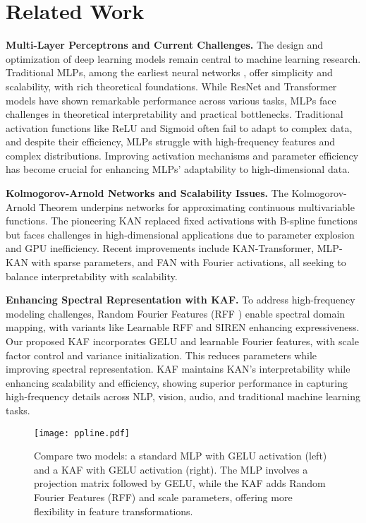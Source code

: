 \section{Related Work}
\textbf{Multi-Layer Perceptrons and Current Challenges.} The design and optimization of deep learning \cite{deit}models remain central to machine learning research. Traditional MLPs\cite{MLP}, among the earliest neural networks \cite{sjwl02}, offer simplicity and scalability, with rich theoretical foundations. While ResNet \cite{resnet18} and Transformer \cite{transform} models have shown remarkable performance across various tasks, MLPs face challenges in theoretical interpretability and practical bottlenecks. Traditional activation functions like ReLU \cite{ReLU1,ReLU2} and Sigmoid \cite{Sigmoidjihuo} often fail to adapt to complex data, and despite their efficiency, MLPs struggle with high-frequency features and complex distributions. Improving activation mechanisms and parameter efficiency has become crucial for enhancing MLPs' adaptability to high-dimensional data.

\textbf{Kolmogorov-Arnold Networks and Scalability Issues.} The Kolmogorov-Arnold \cite{2019duichengkanl} Theorem underpins networks for approximating continuous multivariable functions. The pioneering KAN replaced fixed activations with B-spline \cite{B-spline} functions but faces challenges in high-dimensional applications due to parameter explosion and GPU inefficiency. Recent improvements include KAN-Transformer, MLP-KAN with sparse parameters, and FAN\cite{FAN} with Fourier activations, all seeking to balance interpretability with scalability.

\textbf{Enhancing Spectral Representation with KAF.} To address high-frequency modeling challenges, Random Fourier Features (RFF \cite{suijifuly,suijifulye2}) enable spectral domain mapping, with variants like Learnable RFF and SIREN enhancing expressiveness. Our proposed KAF incorporates GELU and learnable Fourier features, with scale factor control and variance initialization. This reduces parameters while improving spectral representation. KAF maintains KAN's interpretability while enhancing scalability and efficiency, showing superior performance in capturing high-frequency\cite{SIRENgaoping} details across NLP, vision, audio, and traditional machine learning tasks.
\begin{figure*}[t]  %
    \centering
    \texttt{[image: ppline.pdf]}  %
    \vspace{-20pt}
    \caption{Compare two models: a standard MLP with GELU activation (left) and a KAF with GELU activation (right). The MLP involves a projection matrix followed by GELU, while the KAF adds Random Fourier Features (RFF) and scale parameters, offering more flexibility in feature transformations.}
    \label{fig:pipeline}
\end{figure*}